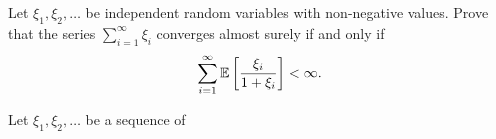 \begin{problem}{6}
    Let $\xi_1,\xi_2,\ldots$ be independent random variables with non-negative values. Prove that the series $\sum_{i=1}^\infty \xi_i$ converges almost surely if and only if \[
    \sum_{i=1}^\infty \mathbb{E}\left[\frac{\xi_i}{1 + \xi_i}\right] < \infty.
    \]
\end{problem}
\begin{solution}
    
\end{solution}

\begin{problem}{7}
    Let $\xi_1,\xi_2,\ldots$ be a sequence of 
\end{problem}
\begin{solution}
    
\end{solution}